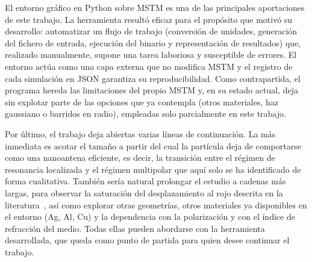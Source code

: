 El entorno gráfico en Python sobre MSTM es una de las principales 
aportaciones de este trabajo. La herramienta resultó eficaz para el propósito que
motivó su desarrollo: automatizar un flujo de trabajo (conversión de
unidades, generación del fichero de entrada, ejecución del binario y
representación de resultados) que, realizado manualmente, 
supone una tarea laboriosa y susceptible de errores.
El entorno actúa como una capa externa que no modifica MSTM 
y el registro de cada simulación en JSON garantiza su reproducibilidad.
Como contrapartida, el programa hereda las limitaciones del propio MSTM y, en su
estado actual, deja sin explotar parte de las opciones que ya contempla
(otros materiales, haz gaussiano o barridos en radio), empleadas solo
parcialmente en este trabajo.

Por último, el trabajo deja abiertas varias líneas de continuación. La más
inmediata es acotar el tamaño a partir del cual la partícula deja de
comportarse como una nanoantena eficiente, es decir, la transición entre el
régimen de resonancia localizada y el régimen multipolar que aquí solo se ha
identificado de forma cualitativa. También sería natural prolongar el estudio
a cadenas más largas, para observar la saturación del desplazamiento al rojo
descrita en la literatura~\cite{Harris2009,Barrow2011}, así como explorar
otras geometrías, otros materiales ya disponibles en el entorno (Ag, Al, Cu)
y la dependencia con la polarización y con el índice de refracción del medio.
Todas ellas pueden abordarse con la herramienta desarrollada, que queda como punto
de partida para quien desee continuar el trabajo.